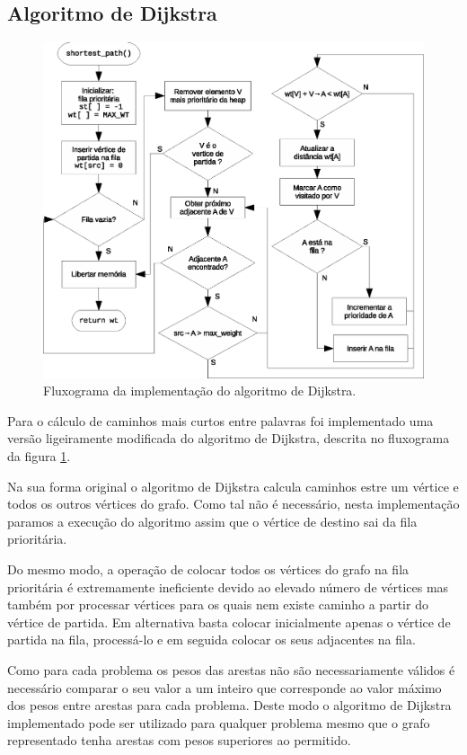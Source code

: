 \documentclass[portuguese, a4paper]{article}
\begin{document}
	\subsection{Algoritmo de Dijkstra}
	\label{sec:alg_dijkstra}
	\begin{figure}[H]
		\centering
		\includegraphics[width=0.85\linewidth]{dijkstra}
		\caption{Fluxograma da implementação do algoritmo de Dijkstra.}
		\label{fig:dijkstra}
	\end{figure}
	\par
	Para o cálculo de caminhos mais curtos entre palavras foi implementado uma
	versão ligeiramente modificada do algoritmo de Dijkstra, descrita no
	fluxograma da figura \ref{fig:dijkstra}.
	\par
	Na sua forma original o algoritmo de Dijkstra calcula caminhos estre um
	vértice e todos os outros vértices do grafo. Como tal não é necessário,
	nesta implementação paramos a execução do algoritmo assim que o vértice de
	destino sai da fila prioritária.
	\par
	Do mesmo modo, a operação de colocar todos os vértices do grafo na fila
	prioritária é extremamente ineficiente devido ao elevado número de
	vértices mas também por processar vértices para os quais nem existe caminho
	a partir do vértice de partida. Em alternativa basta colocar inicialmente
	apenas o vértice de partida na fila, processá-lo e em seguida colocar os
	seus adjacentes na fila.
	\par
	Como para cada problema os pesos das arestas não são necessariamente válidos
	é necessário comparar o seu valor a um inteiro que corresponde ao valor
	máximo dos pesos entre arestas para cada problema.
	Deste modo o algoritmo de Dijkstra implementado pode ser utilizado para
	qualquer problema mesmo que o grafo representado tenha arestas com pesos
	superiores ao permitido.
\end{document}

